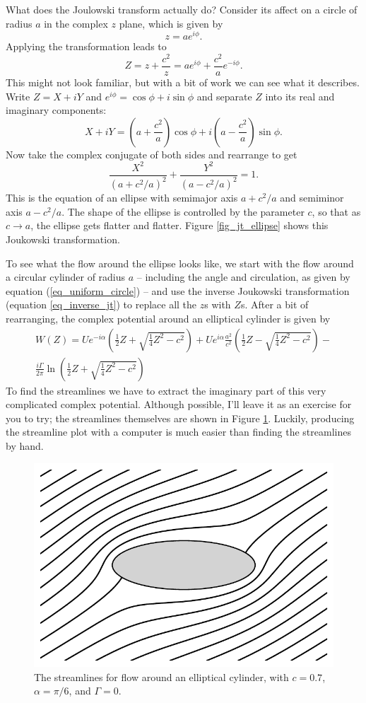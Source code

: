 What does the Joulowski transform actually do?  Consider its affect on a circle of radius $a$ in the complex $z$ plane, which is given by
\[
z = a e^{i\phi}.
\]
Applying the transformation leads to 
\[
Z = z + \frac{c^2}{z} = ae^{i\phi} + \frac{c^2}{a} e^{-i\phi}.
\]
This might not look familiar, but with a bit of work we can see what it describes.  Write $Z = X + iY$ and $e^{i\phi} = \cos\phi + i\sin\phi$ and separate $Z$ into its real and imaginary components:
\[
X + iY = \left( a + \frac{c^2}{a} \right) \cos \phi + i \left( a - \frac{c^2}{a} \right) \sin \phi.
\]
Now take the complex conjugate of both sides and rearrange to get
\begin{equation}
\label{eq_ellipse}
\frac{X^2}{(a + c^2/a)^2} + \frac{Y^2}{(a - c^2/a)^2} = 1.
\end{equation}
This is the equation of an ellipse with semimajor axis $a + c^2/a$ and semiminor axis $a - c^2/a$. The shape of the ellipse is controlled by the parameter $c$, so that as $c \to a$, the ellipse gets flatter and flatter.  Figure \ref{fig_jt_ellipse} shows this Joukowski transformation.

To see what the flow around the ellipse looks like, we start with the flow around a circular cylinder of radius $a$ -- including the angle and circulation, as given by equation (\ref{eq_uniform_circle}) -- and use the inverse Joukowski transformation (equation \ref{eq_inverse_jt}) to replace all the $z$s with $Z$s. After a bit of rearranging, the complex potential around an elliptical cylinder is given by
\begin{multline}
\label{eq_ellipse_w}
W(Z) = Ue^{-i\alpha} \left( \frac{1}{2} Z + \sqrt{\frac{1}{4} Z^2 - c^2} \right) + Ue^{i\alpha} \frac{a^2}{c^2} \left( \frac{1}{2} Z - \sqrt{\frac{1}{4} Z^2 - c^2} \right) - \\ \frac{i\Gamma}{2\pi} \ln \left( \frac{1}{2} Z + \sqrt{\frac{1}{4} Z^2 - c^2} \right)
\end{multline}
To find the streamlines we have to extract the imaginary part of this very complicated complex potential.  Although possible, I'll leave it as an exercise for you to try; the streamlines themselves are shown in Figure \ref{fig_ellipse}. Luckily, producing the streamline plot with a computer is much easier than finding the streamlines by hand.

\begin{figure}
\centering\includegraphics[width=0.7\linewidth]{Figures/Chapter4/fig_ellipse}
\caption{The streamlines for flow around an elliptical cylinder, with $c=0.7$, $\alpha = \pi/6$, and $\Gamma= 0$.}
\label{fig_ellipse}
\end{figure}



